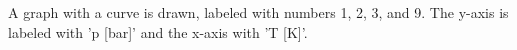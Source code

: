 A graph with a curve is drawn, labeled with numbers 1, 2, 3, and 9. The y-axis is labeled with 'p [bar]' and the x-axis with 'T [K]'.